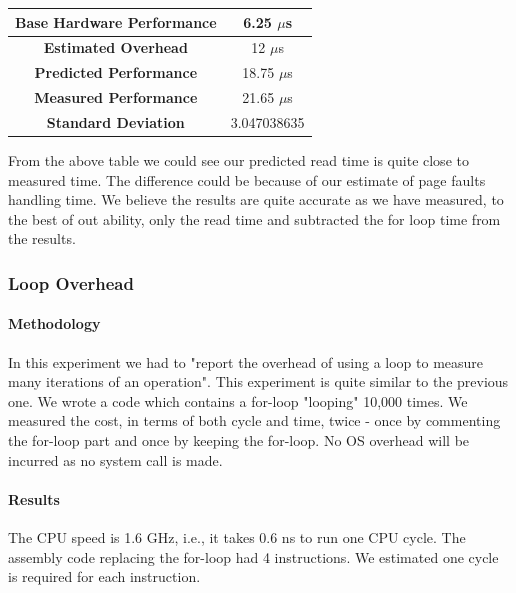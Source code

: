 \documentclass[conference]{IEEEtran}
\begin{document}
\begin{center}
\begin{tabular}{ |c|c| } 
  \hline
  \textbf{Base Hardware Performance} & 6.25 $\mu$s \\ 
  \hline
  \textbf{Estimated Overhead} &  12 $\mu$s \\ 
  \hline
  \textbf{Predicted Performance} & 18.75 $\mu$s \\ 
  \hline
  \textbf{Measured Performance} & 21.65 $\mu$s \\ 
  \hline
  \textbf{Standard Deviation} & 3.047038635 \\ 
  \hline
\end{tabular}
\end{center}

From the above table we could see our predicted read time is quite close to measured time. The difference could be because of our estimate of page faults handling time.
We believe the results are quite accurate as we have measured, to the best of out ability, only the read time and subtracted the for loop time from the results.


\subsubsection{Loop Overhead}

\paragraph{Methodology}

In this experiment we had to "report the overhead of using a loop to measure many iterations of an operation".
This experiment is quite similar to the previous one. We wrote a code which contains a for-loop "looping" 10,000 times. We measured the cost, in terms of both cycle and time, twice - once by commenting the for-loop part and once by keeping the for-loop. No OS overhead will be incurred as no system call is made.

\paragraph{Results}

The CPU speed is 1.6 GHz, i.e., it takes 0.6 ns to run one CPU cycle. The assembly code replacing the for-loop had 4 instructions. We estimated one cycle is required for each instruction.
\end{document}
